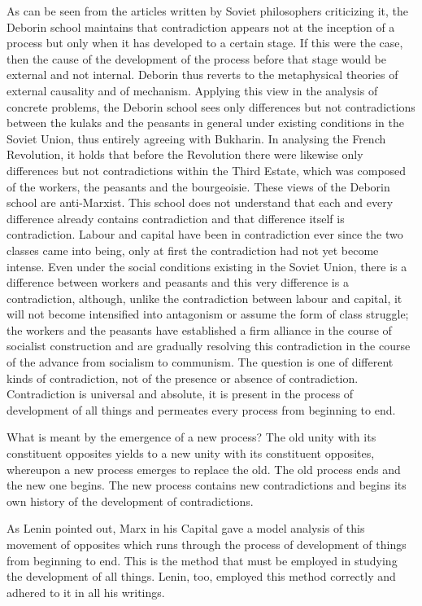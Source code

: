 \documentclass{article}
\begin{document}
As can be seen from the articles written by Soviet philosophers criticizing it,
the Deborin school maintains that contradiction appears not at the inception of
a process but only when it has developed to a certain stage. If this were the
case, then the cause of the development of the process before that stage would
be external and not internal. Deborin thus reverts to the metaphysical theories
of external causality and of mechanism. Applying this view in the analysis of
concrete problems, the Deborin school sees only differences but not
contradictions between the kulaks and the peasants in general under existing
conditions in the Soviet Union, thus entirely agreeing with Bukharin. In
analysing the French Revolution, it holds that before the Revolution there were
likewise only differences but not contradictions within the Third Estate, which
was composed of the workers, the peasants and the bourgeoisie. These views of
the Deborin school are anti-Marxist. This school does not understand that each
and every difference already contains contradiction and that difference itself
is contradiction. Labour and capital have been in contradiction ever since the
two classes came into being, only at first the contradiction had not yet become
intense. Even under the social conditions existing in the Soviet Union, there
is a difference between workers and peasants and this very difference is
a contradiction, although, unlike the contradiction between labour and capital,
it will not become intensified into antagonism or assume the form of class
struggle; the workers and the peasants have established a firm alliance in the
course of socialist construction and are gradually resolving this contradiction
in the course of the advance from socialism to communism. The question is one
of different kinds of contradiction, not of the presence or absence of
contradiction. Contradiction is universal and absolute, it is present in the
process of development of all things and permeates every process from beginning
to end.

What is meant by the emergence of a new process? The old unity with its
constituent opposites yields to a new unity with its constituent opposites,
whereupon a new process emerges to replace the old. The old process ends and
the new one begins. The new process contains new contradictions and begins its
own history of the development of contradictions.

As Lenin pointed out, Marx in his Capital gave a model analysis of this
movement of opposites which runs through the process of development of things
from beginning to end. This is the method that must be employed in studying the
development of all things. Lenin, too, employed this method correctly and
adhered to it in all his writings.
\end{document}
